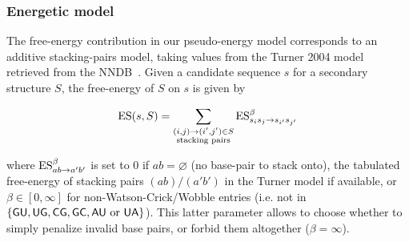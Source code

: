 \subsubsection{Energetic model}

The free-energy contribution in our pseudo-energy model corresponds to an additive stacking-pairs model, taking values from the Turner 2004 model retrieved from the NNDB~\cite{Turner2010}. Given a candidate sequence $s$ for a secondary structure $S$, the free-energy of $S$ on $s$ is given by

\begin{align*}
  \text{ES}(s,S) = \sum_{\substack{(i,j)\to (i',j')\in S\\ \text{stacking pairs}}}\text{ES}^{\beta}_{s_is_j\to s_{i'}s_{j'}} 
\end{align*}


where $\text{ES}^{\beta}_{ab\to a'b'}$ is set to $0$ if $ab=\varnothing$ (no base-pair to stack onto), the tabulated free-energy of stacking pairs $(ab)/(a'b')$ in the Turner model if available, or $\beta\in[0,\infty]$ for non-Watson-Crick/Wobble entries (i.e. not in $\{{\sf{G}}{\sf{U}},{\sf{U}}{\sf{G}},{\sf{C}}{\sf{G}},{\sf{G}}{\sf{C}}, {\sf{A}}{\sf{U}}\text{ or }{\sf{U}}{\sf{A}}\}$). This latter parameter allows to choose whether to simply penalize invalid base pairs, or forbid them altogether ($\beta = \infty$).


